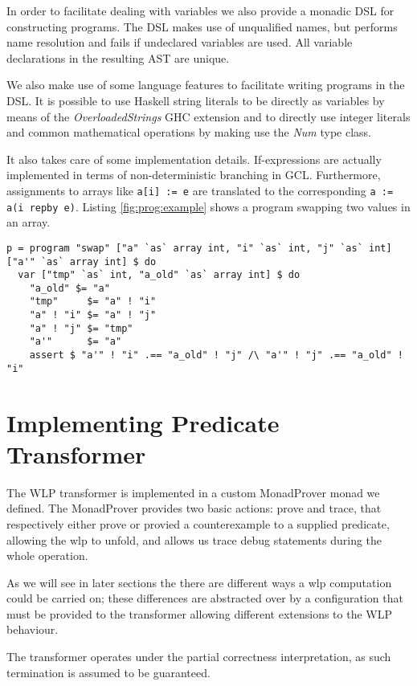 \documentclass[]{scrartcl}
\begin{document}
In order to facilitate dealing with variables we also provide a monadic DSL for constructing programs.
The DSL makes use of unqualified names, but performs name resolution and fails if undeclared variables
are used. All variable declarations in the resulting AST are unique.

We also make use of some language features to facilitate writing programs in the DSL.
It is possible to use Haskell string literals to be directly as variables by means of the
\emph{OverloadedStrings} GHC extension and to directly use integer literals and common mathematical
operations by making use the \emph{Num} type class.

It also takes care of some implementation details. If-expressions are actually implemented in terms of
non-deterministic branching in GCL. Furthermore, assignments to arrays like
\lstinline|a[i] := e| are translated to the corresponding \lstinline|a := a(i repby e)|.
Listing \ref{fig:prog:example} shows a program swapping two values in an array.

\begin{lstlisting}[caption=A program swapping the values at two indices in an array, label=fig:prog:example]
p = program "swap" ["a" `as` array int, "i" `as` int, "j" `as` int] ["a'" `as` array int] $ do
  var ["tmp" `as` int, "a_old" `as` array int] $ do
    "a_old" $= "a"
    "tmp"     $= "a" ! "i"
    "a" ! "i" $= "a" ! "j"
    "a" ! "j" $= "tmp"
    "a'"      $= "a"
    assert $ "a'" ! "i" .== "a_old" ! "j" /\ "a'" ! "j" .== "a_old" ! "i"
\end{lstlisting}

\section{Implementing Predicate Transformer}

The WLP transformer is implemented in a custom MonadProver monad we defined.
The MonadProver provides two basic actions: prove and trace, that respectively
either prove or provied a counterexample to a supplied predicate, allowing the
wlp to unfold, and allows us trace debug statements during the whole operation.

As we will see in later sections the there are different ways a wlp computation
could be carried on; these differences are abstracted over by a configuration
that must be provided to the transformer allowing different extensions to the
WLP behaviour.

The transformer operates under the partial correctness interpretation, as such
termination is assumed to be guaranteed.
\end{document}
